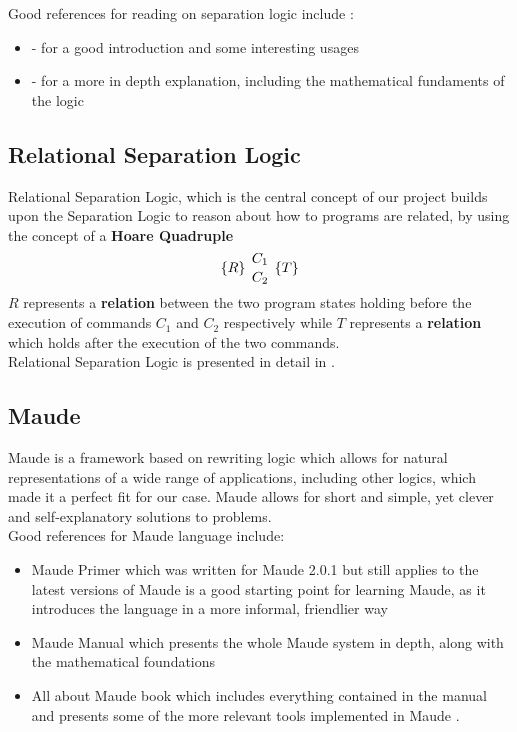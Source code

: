 \documentclass[12pt,a4paper]{article}
\begin{document}
Good references for reading on separation logic include : 
\begin{itemize}
	\item \cite{primer} - for a good introduction and some interesting usages
	\item \cite{SeparationLogic} - for a more in depth explanation, including the mathematical fundaments of the logic
\end{itemize} 
\subsection{Relational Separation Logic}
Relational Separation Logic, which is the central concept of our project builds upon the Separation Logic to reason about how to programs are related, by using the concept of a \textbf{Hoare Quadruple}
\[\{R\}\ {C_1 \atop C_2}\   \{T\}\]
\(R\) represents a \textbf{relation} between the two program states holding before the execution of commands \(C_1\) and \(C_2\) respectively while \(T\) represents a \textbf{relation} which holds after the execution of the two commands. 
\\

Relational Separation Logic is presented in detail in \cite{relational}.
\subsection{Maude}
Maude \cite{maudesite} is a framework based on rewriting logic \cite{rewritingLogic} which allows for natural representations of a wide range of applications, including other logics, which made it a perfect fit for our case. Maude allows for short and simple, yet clever and self-explanatory solutions to problems. 
\\

 Good references for Maude language include:
 \begin{itemize}
 	\item Maude Primer \cite{primer} which was written for Maude 2.0.1 but still applies to the latest versions of Maude is a good starting point for learning Maude, as it introduces the language in a more informal, friendlier way
 	\item Maude Manual \cite{manual} which presents the whole Maude system in depth, along with the mathematical foundations
 	\item All about Maude book \cite{allAboutMaude} which includes everything contained in the manual and presents some of the more relevant tools implemented in Maude .
 \end{itemize}
\end{document}
